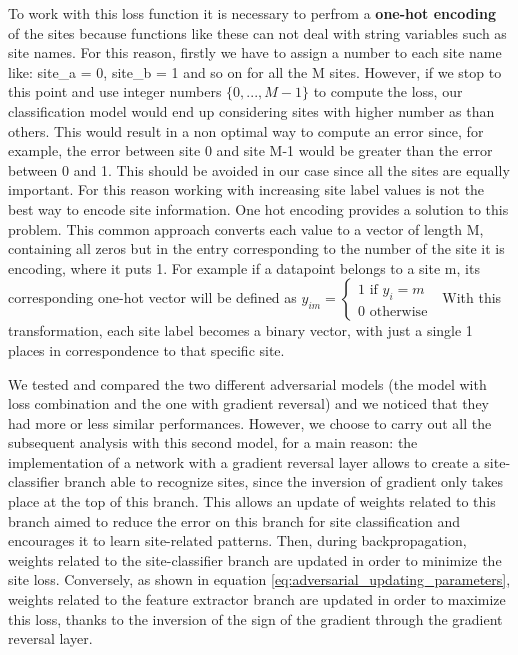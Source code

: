 \documentclass[11pt]{report}
\begin{document}
To work with this loss function it is necessary to perfrom a \textbf{one-hot encoding} of the sites because functions like these can not deal with string variables such as site names.
For this reason, firstly we have to assign a number to each site name like: site\_a = 0, site\_b = 1 and so on for all the M sites.
However, if we stop to this point and use integer numbers $\{0, ..., M-1\}$ to compute the loss, our classification model would end up considering sites with higher number as   than others.
This would result in a non optimal way to compute an error since, for example, the error between site 0 and site M-1 would be greater than the error between 0 and 1.
This should be avoided in our case since all the sites are equally important. For this reason working with increasing site label values is not the best way to encode site information. %
One hot encoding provides a solution to this problem.
This common approach converts each value to a vector of length M, containing all zeros but in the entry corresponding to the number of the site it is encoding, where it puts 1.
For example if a datapoint belongs to a site m, its corresponding one-hot vector will be defined as $y_{im} = \begin{cases} 1  \text{ if } y_i = m \\ 0 \text{ otherwise }\end{cases}$
With this transformation, each site label becomes a binary vector, with just a single 1 places in correspondence to that specific site.


\hfill

We tested and compared the two different adversarial models (the model with loss combination and the one with gradient reversal) and we noticed that they had more or less similar performances. However, we choose to carry out all the subsequent analysis with this second model, for a main reason:
the implementation of a network with a gradient reversal layer allows to create a site-classifier branch able to recognize sites, since the inversion of gradient only takes place at the top of this branch. This allows an update of weights related to this branch aimed to reduce the error on this branch for site classification and encourages it to learn site-related patterns. 
Then, during backpropagation, weights related to the site-classifier branch are updated in order to minimize the site loss.
Conversely, as shown in equation \ref{eq:adversarial_updating_parameters}, weights related to the feature extractor branch are updated in order to maximize this loss, thanks to the inversion of the sign of the gradient through the gradient reversal layer.
\end{document}

